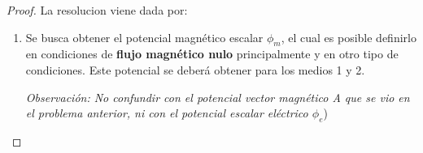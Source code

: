 \begin{problema}
\begin{center}
\end{center}
\end{problema}
\begin{proof}%
    La resolucion viene dada por:
   \begin{enumerate}
    \item Se busca obtener el potencial magnético escalar $\phi_{m}$, el cual es posible definirlo en condiciones de \textbf{flujo magnético nulo} principalmente y en otro tipo de condiciones. Este potencial se deberá obtener para los medios 1 y 2.
    
    \textit{Observación: No confundir con el potencial vector magnético A que se vio en el problema anterior, ni con el potencial escalar eléctrico $\phi_{e}$})


\end{enumerate}
\end{proof}
